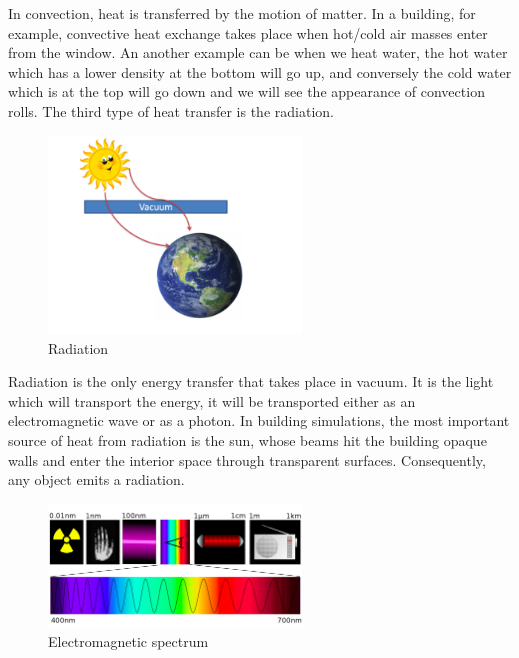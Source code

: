 \noindent In convection, heat is transferred by the motion of matter. In a building, for example, convective heat exchange takes place when hot/cold air masses enter from the window. An another example can be when we heat water, the hot water which has a lower density at the bottom will go up, and conversely the cold water which is at the top will go down and we will see the appearance of convection rolls. 
\newline \noindent The third type of heat transfer is the radiation.
  \begin{figure}[H]
        \centering
		\includegraphics[width=0.6\textwidth]{"images/enkf/flux_4.png"}
		\caption{Radiation}
\end{figure}
\noindent Radiation is the only energy transfer that takes place in vacuum. It is the light which will transport the energy, it will be transported either as an electromagnetic wave or as a photon. In building simulations, the most important source of heat from radiation is the sun, whose beams hit the building opaque walls and enter the interior space through transparent surfaces.
Consequently, any object emits a radiation. 
     \begin{figure}[H]
        \centering
		\includegraphics[width=0.6\textwidth]{"images/enkf/flux_3.png"}
		\caption{Electromagnetic spectrum}
\end{figure}
